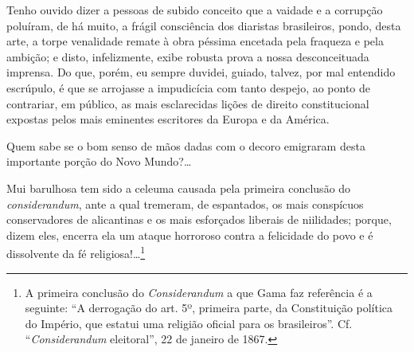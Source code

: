 Tenho ouvido dizer a pessoas de subido conceito que a vaidade e a
corrupção poluíram, de há muito, a frágil consciência dos diaristas
brasileiros, pondo, desta arte, a torpe venalidade remate à obra péssima
encetada pela fraqueza e pela ambição; e disto, infelizmente, exibe
robusta prova a nossa desconceituada imprensa. Do que, porém, eu sempre
duvidei, guiado, talvez, por mal entendido escrúpulo, é que se arrojasse
a impudicícia com tanto despejo, ao ponto de contrariar, em público, as
mais esclarecidas lições de direito constitucional expostas pelos mais
eminentes escritores da Europa e da América.

Quem sabe se o bom senso de mãos dadas com o decoro emigraram desta
importante porção do Novo Mundo?\ldots{}

Mui barulhosa tem sido a celeuma causada pela primeira conclusão do
\textit{considerandum}, ante a qual tremeram, de espantados, os mais conspícuos
conservadores de alicantinas e os mais esforçados liberais de
niilidades; porque, dizem eles, encerra ela um ataque horroroso contra a
felicidade do povo e é dissolvente da fé religiosa!\ldots{}\footnote{A
  primeira conclusão do \emph{Considerandum} a que Gama faz referência é a
  seguinte: ``A derrogação do art. 5º, primeira parte, da Constituição
  política do Império, que estatui uma religião oficial para os
  brasileiros''. Cf. ``\emph{Considerandum} eleitoral'', 22 de janeiro de 1867.}

